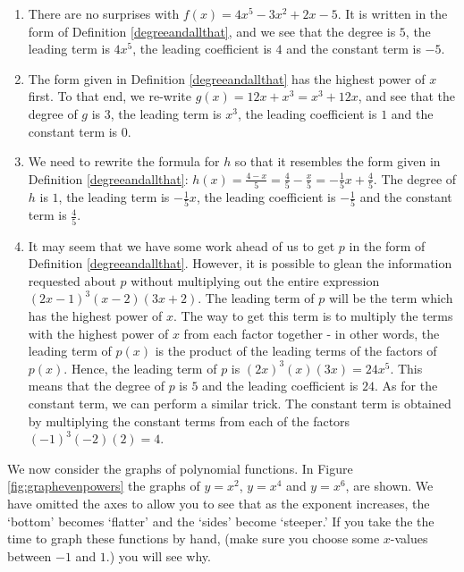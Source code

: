 {
\begin{enumerate}

\item  There are no surprises with $f(x) = 4x^5 - 3x^2 + 2x - 5$.  It is written in the form of Definition \ref{degreeandallthat}, and we see that the degree is $5$, the leading term is $4x^5$, the leading coefficient is $4$ and the constant term is $-5$.

\item The form given in Definition \ref{degreeandallthat} has the highest power of $x$ first.  To that end, we re-write $g(x) = 12x +x^3 = x^3+12x$, and see that the degree of $g$ is $3$, the leading term is $x^3$, the leading coefficient is $1$ and the constant term is $0$.

\item  We need to rewrite the formula for $h$ so that it resembles the form given in Definition \ref{degreeandallthat}:  $h(x) = \frac{4-x}{5} = \frac{4}{5} - \frac{x}{5} = -\frac{1}{5} x + \frac{4}{5}$.  The degree of $h$ is $1$, the leading term is $-\frac{1}{5} x$, the leading coefficient is $-\frac{1}{5}$ and the constant term is $\frac{4}{5}$.

\item  It may seem that we have some work ahead of us to get $p$ in the form of Definition \ref{degreeandallthat}.  However, it is possible to glean the information requested about $p$ without multiplying out the entire expression $(2x-1)^{3}(x-2)(3x+2)$.  The leading term of $p$ will be the term which has the highest power of $x$.  The way to get this term  is to multiply the terms with the highest power of $x$ from each factor together - in other words, the leading term of $p(x)$ is the product of the leading terms of the factors of $p(x)$.  Hence, the leading term of $p$ is $(2x)^3(x)(3x) =  24x^5$.  This means that the degree of $p$ is $5$ and the leading coefficient is $24$.  As for the constant term, we can perform a similar trick.  The constant term is obtained by multiplying the constant terms from each of the factors $(-1)^3(-2)(2) = 4$.  

\end{enumerate}
}

\medskip

We now consider the graphs of polynomial functions.  In Figure \ref{fig:graphevenpowers} the graphs of $y=x^2$, $y=x^4$ and $y=x^6$, are shown.  We have omitted the axes to allow you to see that as the exponent increases, the `bottom' becomes `flatter' and the `sides' become `steeper.'  If you take the the time to graph these functions by hand, (make sure you choose some $x$-values between $-1$ and $1$.) you will see why. 

